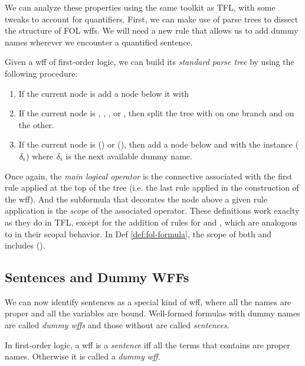 We can analyze these properties using the same toolkit as TFL, with some tweaks
to account for quantifiers. First, we can make use of parse trees to dissect
the structure of FOL wffs. We will need a new rule that allows us to add dummy
names wherever we encounter a quantified sentence.

\begin{definition}
  Given a wff of first-order logic, we can build its \emph{standard parse tree}
  by using the following procedure:
  \begin{enumerate}
  \item If the current node is \enot\ephi add a node below it with \ephi
  \item If the current node is \ephi\eand\epsi, \ephi\eor\epsi,
    \ephi\eif\epsi, or \ephi\eiff\epsi, then split the tree with \ephi on
    one branch and \epsi on the other.
  \item If the current node is \eexists\exi\ephi(\exi) or
    \eforall\exi\ephi(\exi), then add a node below and with the instance
    \ephi($\delta_i$) where $\delta_i$ is the next available dummy name.
  \end{enumerate}
\end{definition}

Once again, the \emph{main logical operator} is the connective associated with
the first rule applied at the top of the tree (i.e. the last rule applied in the
construction of the wff). And the subformula that decorates the node above a
given rule application is the \emph{scope} of the associated operator. These
definitions work exaclty as they do in TFL, except for the addition of rules
for \eforall and \eexists, which are analogous to \enot in their scopal
behavior. In Def \ref{def:fol-formula}, the scope of both \eforall\exi and
\eexists\exi includes \ephi(\exi).

\subsection{Sentences and Dummy WFFs}

We can now identify sentences as a special kind of wff, where all the names are
proper and all the variables are bound. Well-formed formulas with dummy names
are called \emph{dummy wffs} and those without are called \emph{sentences}.

\begin{definition}[Sentence]
  \label{def:fol-sentence}
  In first-order logic, a wff \ephi is a \emph{sentence} iff all the terms that
  \ephi contains are proper names. Otherwise it is called a \emph{dummy wff}.
\end{definition}

